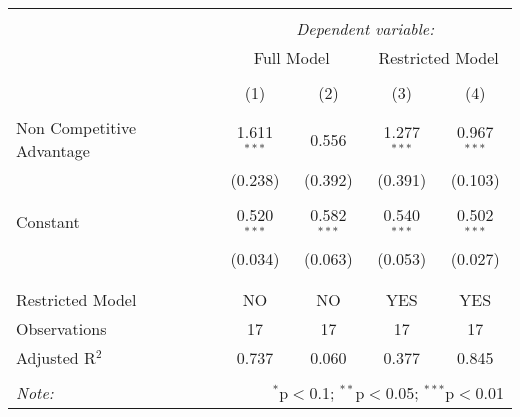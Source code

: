 
\begin{table}[!htbp] \centering 
  \caption{} 
  \label{} 
\begin{tabular}{@{\extracolsep{5pt}}lcccc} 
\\[-1.8ex]\hline 
\hline \\[-1.8ex] 
 & \multicolumn{4}{c}{\textit{Dependent variable:}} \\ 
\cline{2-5} 
 & \multicolumn{2}{c}{Full Model} & \multicolumn{2}{c}{Restricted Model} \\ 
\\[-1.8ex] & (1) & (2) & (3) & (4)\\ 
\hline \\[-1.8ex] 
 Non Competitive Advantage & 1.611$^{***}$ & 0.556 & 1.277$^{***}$ & 0.967$^{***}$ \\ 
  & (0.238) & (0.392) & (0.391) & (0.103) \\ 
  & & & & \\ 
 Constant & 0.520$^{***}$ & 0.582$^{***}$ & 0.540$^{***}$ & 0.502$^{***}$ \\ 
  & (0.034) & (0.063) & (0.053) & (0.027) \\ 
  & & & & \\ 
\hline \\[-1.8ex] 
Restricted Model & NO & NO & YES & YES \\ 
Observations & 17 & 17 & 17 & 17 \\ 
Adjusted R$^{2}$ & 0.737 & 0.060 & 0.377 & 0.845 \\ 
\hline 
\hline \\[-1.8ex] 
\textit{Note:}  & \multicolumn{4}{r}{$^{*}$p$<$0.1; $^{**}$p$<$0.05; $^{***}$p$<$0.01} \\ 
\end{tabular} 
\end{table} 
